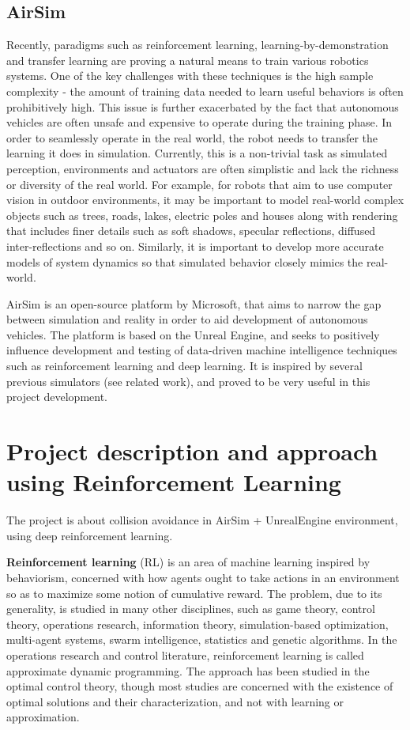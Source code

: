 \documentclass{article}
\begin{document}
\subsection{AirSim}

Recently, paradigms such as reinforcement learning, learning-by-demonstration
and transfer learning are proving a natural means to train various robotics
systems. One of the key challenges with these techniques is the high sample
complexity - the amount of training data needed to learn useful behaviors is often
prohibitively high. This issue is further exacerbated by the fact that autonomous
vehicles are often unsafe and expensive to operate during the training phase. In order to
seamlessly operate in the real world, the robot needs to transfer the learning it does
in simulation. Currently, this is a non-trivial task as simulated perception, environments
and actuators are often simplistic and lack the richness or diversity of the
real world. For example, for robots that aim to use computer vision in outdoor
environments, it may be important to model real-world complex objects such as trees,
roads, lakes, electric poles and houses along with rendering that includes finer
details such as soft shadows, specular reflections, diffused inter-reflections and so on.
Similarly, it is important to develop more accurate models of system dynamics so
that simulated behavior closely mimics the real-world.

AirSim  is  an  open-source  platform \cite{airsim2017fsr} by Microsoft,
that  aims  to  narrow  the  gap  between
simulation  and  reality  in  order  to
aid  development  of  autonomous  vehicles.
The platform is based on the Unreal Engine, and seeks to positively
influence development and testing of data-driven
machine intelligence techniques such as reinforcement learning and
deep learning. It is inspired by several previous simulators (see
related work), and proved to be very useful in this project development.

\section{Project description and approach using Reinforcement Learning}

The project is about collision avoidance in AirSim +
UnrealEngine environment, using deep reinforcement learning.

{\bf Reinforcement learning }(RL) is an area of machine learning inspired
by behaviorism, concerned with how agents ought to take actions in an
environment so as to maximize some notion of cumulative reward.
The problem, due to its generality, is studied in many other disciplines,
such as game theory, control theory, operations research, information theory,
simulation-based optimization, multi-agent systems, swarm intelligence,
statistics and genetic algorithms. In the operations research and
control literature, reinforcement learning is called approximate dynamic
programming. The approach has been studied in the optimal control theory,
though most studies are concerned with the existence of optimal
solutions and their characterization, and not with learning or approximation.
\end{document}
